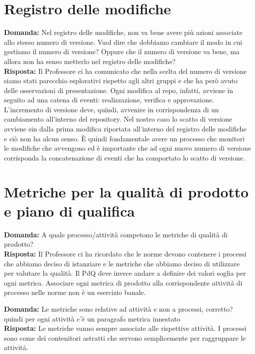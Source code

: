 \documentclass{article}
\begin{document}
\section{Registro delle modifiche}%
\label{sec:registro_delle_modifiche}
\textbf{Domanda:} Nel registro delle modifiche, non va bene avere più azioni associate allo stesso numero di versione. Vuol dire che dobbiamo cambiare il modo in cui gestiamo il numero di versione? Oppure che il numero di versione va bene, ma allora non ha senso metterlo nel registro delle modifiche?\\
\textbf{Risposta:} Il Professore ci ha comunicato che nella scelta del numero di versione siamo stati parecchio esplorativi rispetto agli altri gruppi e che ha però avuto delle osservazioni di presentazione. Ogni modifica al repo, infatti, avviene in seguito ad una catena di eventi: realizzazione, verifica e approvazione. L'incremento di versione deve, quindi, avvenire in corrispondenza di un cambiamento all'interno del repository. Nel nostro caso lo scatto di versione avviene sin dalla prima modifica riportata all'interno del registro delle modifiche e ciò non ha alcun senso. È quindi fondamentale avere un processo che monitori le modifiche che avvengono ed è importante che ad ogni nuovo numero di versione corrisponda la concatenazione di eventi che ha comportato lo scatto di versione.
\section{Metriche per la qualità di prodotto e piano di qualifica}%
\label{sec:metriche_per_la_qualita_di_prodotto_e_piano_di_qualifica}
\textbf{Domanda:} A quale processo/attività competono le metriche di qualità di prodotto?\\
\textbf{Risposta:} Il Professore ci ha ricordato che le norme devono contenere i processi che abbiamo deciso di istanziare e le metriche che abbiamo deciso di utilizzare per valutare la qualità. Il PdQ deve invece andare a definire dei valori soglia per ogni metrica. Associare ogni metrica di prodotto alla corrispondente attività di processo nelle norme non è un esercizio banale.

\textbf{Domanda:} Le metriche sono relative ad attività e non a processi, corretto? quindi per ogni attività c’è un paragrafo metrica innestato\\
\textbf{Risposta:} Le metriche vanno sempre associate alle rispettive attività. I processi sono come dei contenitori astratti che servono semplicemente per raggruppare le attività.
\newpage
\end{document}
